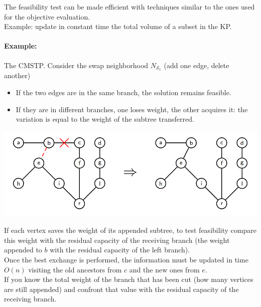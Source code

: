 \documentclass[11pt]{article}
\begin{document}
	The feasibility test can be made efficient with techniques similar to the ones used for the objective evaluation.\\
	
	Example: update in constant time the total volume of a subset in the KP.\\
	
	\newpage
	
	\paragraph{Example:} The CMSTP. Consider the swap neighborhood $N_{\mathcal{S}_1}$ (add one edge, delete another)
	\begin{itemize}
		\item If the two edges are in the same branch, the solution remains feasible.\\
		
		\item If they are in different branches, one loses weight, the other acquires it: the variation is equal to the weight of the subtree transferred.\\
	\end{itemize}
	
	\begin{center}
		\includegraphics[width=0.8\columnwidth]{img/CMST3}
	\end{center}
	
	If each vertex saves the weight of its appended subtree, to test feasibility compare this weight with the residual capacity of the receiving branch (the weight appended to $b$ with the residual capacity of the left branch).\\
	
	Once the best exchange is performed, the information must be updated in time $O (n)$ visiting the old ancestors from $c$ and the new ones from $e$.\\
	
	If you know the total weight of the branch that has been cut (how many vertices are still appended) and confront that value with the residual capacity of the receiving branch.\\
	
\end{document}
